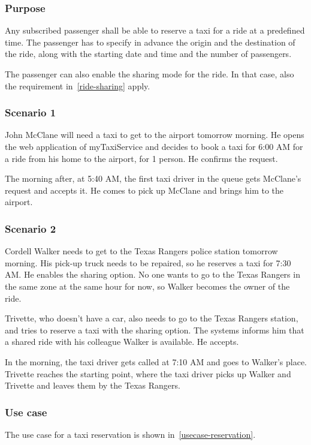 \label{taxi-reservation}
\subsubsection{Purpose}

Any subscribed passenger shall be able to reserve a taxi for a ride at a predefined time. The passenger has to specify in advance the origin and the destination of the ride, along with the starting date and time and the number of passengers.

The passenger can also enable the sharing mode for the ride.
In that case, also the requirement in~\autoref{ride-sharing} apply.

\subsubsection{Scenario 1}
John McClane will need a taxi to get to the airport tomorrow morning. He opens the web application of myTaxiService and decides to book a taxi for 6:00 AM for a ride from his home to the airport, for 1 person. He confirms the request.

The morning after, at 5:40 AM, the first taxi driver in the queue gets McClane's request and accepts it. He comes to pick up McClane and brings him to the airport.

\subsubsection{Scenario 2}
Cordell Walker needs to get to the Texas Rangers police station tomorrow morning.
His pick-up truck needs to be repaired, so he reserves a taxi for 7:30 AM. He enables the sharing option.
No one wants to go to the Texas Rangers in the same zone at the same hour for now, so Walker becomes the owner of the ride.

Trivette, who doesn't have a car, also needs to go to the Texas Rangers station, and tries to reserve a taxi with the sharing option.
The systems informs him that a shared ride with his colleague Walker is available. He accepts.

In the morning, the taxi driver gets called at 7:10 AM and goes to Walker's place.
Trivette reaches the starting point, where the taxi driver picks up Walker and Trivette and leaves them by the Texas Rangers.

\subsubsection{Use case}
The use case for a taxi reservation is shown in~\autoref{usecase-reservation}.

